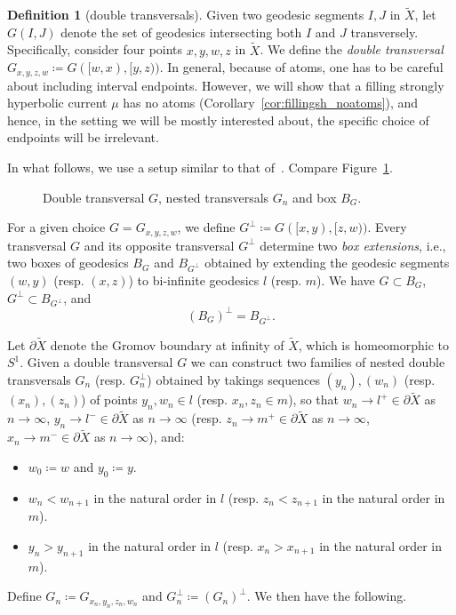 \documentclass[12pt]{amsart}
\newcommand*{\svgfignormal}[1]{\fontsize{9pt}{8pt}\selectfont}
\numberwithin{equation}{section}
\numberwithin{figure}{section}
\theoremstyle{definition}
\newtheorem{definition}[equation]{Definition}
\theoremstyle{plain}
\newcommand*{\wt}[1]{\widetilde{#1}}
\begin{document}
\begin{definition}[double transversals]
Given two geodesic segments $I, J$ in $\wt{X}$, let $G(I,J)$ denote the set of geodesics intersecting both $I$ and $J$ transversely. 
Specifically, consider four points $x,y,w,z$ in $\wt{X}$. We define the \emph{double transversal} $G_{x,y,z,w} \coloneqq G([w,x), [y,z))$.
In general, because of atoms, one has to be careful about including interval endpoints. However, we will show that a filling strongly hyperbolic current $\mu$ has no atoms (Corollary~\ref{cor:fillingsh_noatoms}), and hence, in the setting we will be mostly interested about, the specific choice of endpoints will be irrelevant.

In what follows, we use a setup similar to that of~\cite[Lemma~8.15]{MGT25:Intersections}.
Compare Figure~\ref{fig:doubletransversal}.

  \begin{figure}
\centering{
\svgfignormal{doubletransversal}}
\caption{Double transversal $G$, nested transversals $G_n$ and box $B_G$.}
\label{fig:doubletransversal}
\end{figure}

For a given choice $G=G_{x,y,z,w}$, we define $G^\perp \coloneqq G([x,y), [z,w))$.
Every transversal $G$ and its opposite transversal $G^{\perp}$ determine two \emph{box extensions}, i.e., two boxes of geodesics $B_G$ and $B_{G^{\perp}}$ obtained by extending the geodesic segments $(w,y)$ (resp. $(x,z)$) to bi-infinite geodesics $l$ (resp. $m$).
We have $G \subset B_G$, $G^{\perp}\subset B_{G^\perp}$, and
\[
(B_G)^{\perp}=B_{G^{\perp}}.
\]
\label{def:box_extension}
\end{definition}

Let $\partial \wt{X}$ denote the Gromov boundary at infinity of $\wt{X}$, which is homeomorphic to $S^1$. Given a double transversal $G$ we can construct two families of nested double transversals $G_n$ (resp. $G_n^{\perp}$) obtained by takings sequences $(y_n), (w_n)$ (resp. $(x_n),(z_n)$) of points $y_n , w_n \in l$ (resp. $x_n, z_n \in m$), so that $w_n \to l^+ \in \partial \wt{X}$ as $n\to \infty$, $y_n \to l^-\in \partial \wt{X}$ as $n\to \infty$ (resp. $z_n \to m^+ \in \partial \wt{X}$ as $n\to \infty$, $x_n \to m^- \in \partial \wt{X}$ as $n\to \infty$), and:
\begin{itemize} \item $w_0\coloneqq w$ and $y_0\coloneqq y$.
\item $w_n < w_{n+1}$ in the natural order in $l$ (resp. $z_n < z_{n+1}$ in the natural order in $m$).
\item $y_n > y_{n+1}$ in the natural order in $l$ (resp. $x_n > x_{n+1}$ in the natural order in $m$).
\end{itemize}
Define $G_n \coloneqq G_{x_n,y_n,z_n,w_n}$ and $G_n^\perp \coloneqq (G_n)^\perp$.
We then have the following.
\end{document}
